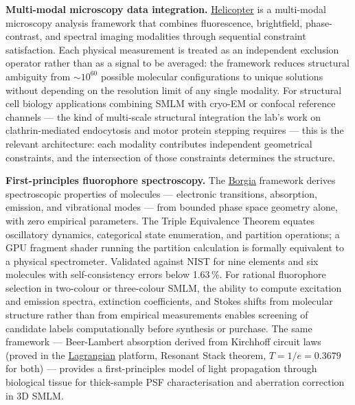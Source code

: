 \documentclass[12pt,a4paper]{article}
\begin{document}
\textbf{Multi-modal microscopy data integration.}
\href{https://github.com/fullscreen-triangle/helicopter}{Helicopter} is a
multi-modal microscopy analysis framework that combines fluorescence, brightfield,
phase-contrast, and spectral imaging modalities through sequential constraint
satisfaction. Each physical measurement is treated as an independent exclusion
operator rather than as a signal to be averaged: the framework reduces structural
ambiguity from $\sim 10^{60}$ possible molecular configurations to unique solutions
without depending on the resolution limit of any single modality.
For structural cell biology applications combining SMLM with cryo-EM or confocal
reference channels --- the kind of multi-scale structural integration the lab's
work on clathrin-mediated endocytosis and motor protein stepping requires ---
this is the relevant architecture: each modality contributes independent
geometrical constraints, and the intersection of those constraints determines
the structure.

\textbf{First-principles fluorophore spectroscopy.}
The \href{https://honjo-masamune.vercel.app/tools}{Borgia} framework derives
spectroscopic properties of molecules --- electronic transitions, absorption,
emission, and vibrational modes --- from bounded phase space geometry alone,
with zero empirical parameters. The Triple Equivalence Theorem equates oscillatory
dynamics, categorical state enumeration, and partition operations; a GPU fragment
shader running the partition calculation is formally equivalent to a physical
spectrometer. Validated against NIST for nine elements and six molecules with
self-consistency errors below 1.63\,\%.
For rational fluorophore selection in two-colour or three-colour SMLM, the ability
to compute excitation and emission spectra, extinction coefficients, and Stokes
shifts from molecular structure rather than from empirical measurements enables
screening of candidate labels computationally before synthesis or purchase.
The same framework --- Beer-Lambert absorption derived from Kirchhoff circuit laws
(proved in the
\href{https://github.com/fullscreen-triangle/lagrangian}{Lagrangian} platform,
Resonant Stack theorem, $T = 1/e = 0.3679$ for both) --- provides a first-principles
model of light propagation through biological tissue for thick-sample PSF
characterisation and aberration correction in 3D SMLM.
\end{document}
